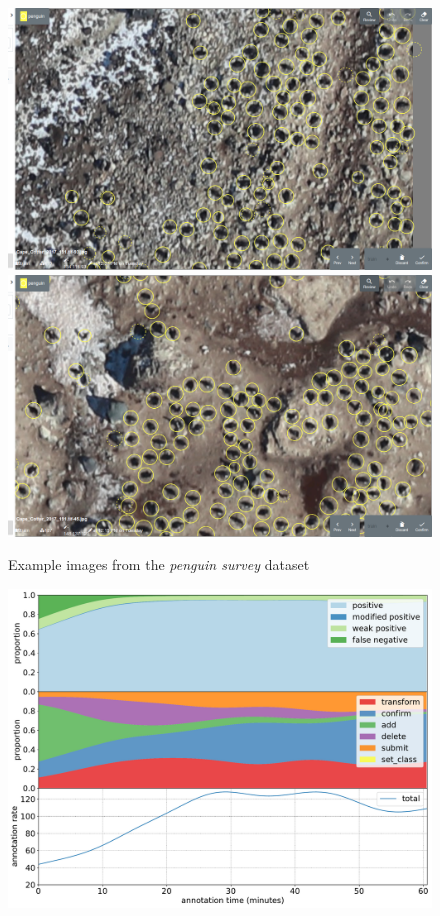 \begin{figure}[!h]
\centering
  \includegraphics[width=0.475\linewidth]{figures/annotation/screenshots/penguins_aerial.png}
  \hfill
  \includegraphics[width=0.475\linewidth]{figures/annotation/screenshots/penguins_aerial2.png}
  \caption{}
\caption{ Example images from the \emph{penguin survey} dataset}
\label {fig:penguin_aerial_examples}
\end{figure}

\begin{figure}[!h]
\centering
\includegraphics[width=1.0\linewidth]{charts/aerial_penguins/action_annotations/cotter_a.pdf}
\caption{  }
\label{fig:cotter_annotation}
\end{figure}

